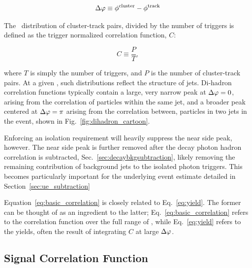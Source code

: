 \begin{equation}
	\Delta\varphi \equiv \phi^\mathrm{cluster} - \phi^\mathrm{track}
\end{equation}

The \deltaphi~distribution of cluster-track pairs, divided by the number of triggers is defined as the trigger normalized correlation function, $C$:

\begin{equation}
  \label{eq:basic_correlation}
  C \equiv \frac{P}{T},
\end{equation}

where $T$ is simply the number of triggers, and $P$ is the number of cluster-track pairs. At a given \deltaphi, such distributions reflect the structure of jets. Di-hadron correlation functions typically contain a large, very narrow peak at $\Delta\varphi=0$, arising from the correlation of particles within the same jet, and a broader peak centered at $\Delta\varphi=\pi$ arising from the correlation between, particles in two jets in the event, shown in Fig.~\ref{fig:dihadron_cartoon}. 

Enforcing an isolation requirement will heavily suppress the near side peak, however. The near side peak is further removed after the decay photon hadron correlation is subtracted, Sec.~\ref{sec:decaybkgsubtraction}, likely removing the remaining contribution of background jets to the isolated photon triggers. This becomes particularly important for the underlying event estimate detailed in Section~\ref{sec:ue_subtraction}




Equation~\ref{eq:basic_correlation} is closely related to Eq.~\ref{eq:yield}. The former can be thought of as an ingredient to the latter; Eq.~\ref{eq:basic_correlation} refers to the correlation function over the full range of \deltaphi, while Eq.~\ref{eq:yield} refers to the yields, often the result of integrating $C$ at large  $\Delta\varphi$.

\subsection{Signal Correlation Function}


